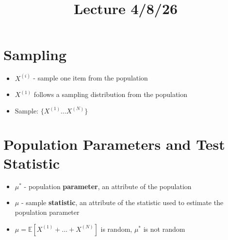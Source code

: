 \documentclass{article}
\title{Lecture 4/8/26}
\author{}
\date{}
\begin{document}
\maketitle

\section{Sampling}
\begin{itemize}
    \item $X^{(i)}$ - sample one item from the population
    \item $X^{(1)}$ follows a sampling distribution from the population
    \item Sample: $\{X^{(1)} \dots X^{(N)}\}$
\end{itemize}

\section{Population Parameters and Test Statistic}
\begin{itemize}
    \item $\mu^*$ - population \textbf{parameter}, an attribute of the population
    \item $\mu$ - sample \textbf{statistic}, an attribute of the statistic used to estimate the population parameter
    \item $\mu = \mathbb{E}[X^{(1)} + \dots + X^{(N)}]$ is random, $\mu^*$ is not random
\end{itemize}
\end{document}

